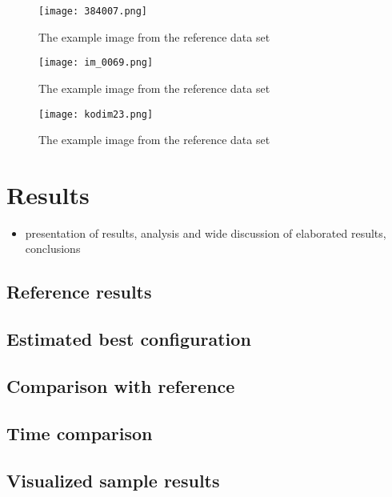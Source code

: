 \begin{figure}
    \centering
    \texttt{[image: 384007.png]}
    \caption{The example image from the reference data set \cite{ref_images}}
    \label{fig:example_1}
\end{figure}

\begin{figure}
    \centering
    \texttt{[image: im\_0069.png]}
    \caption{The example image from the reference data set \cite{ref_images}}
    \label{fig:example_2}
\end{figure}

\begin{figure}
    \centering
    \texttt{[image: kodim23.png]}
    \caption{The example image from the reference data set \cite{ref_images}}
    \label{fig:example_3}
\end{figure}


\section{Results}

\begin{itemize}
	\item presentation of results, analysis and wide discussion of elaborated results, conclusions
\end{itemize}

\subsection{Reference results}

\subsection{Estimated best configuration}

\subsection{Comparison with reference}

\subsection{Time comparison}

\subsection{Visualized sample results}

